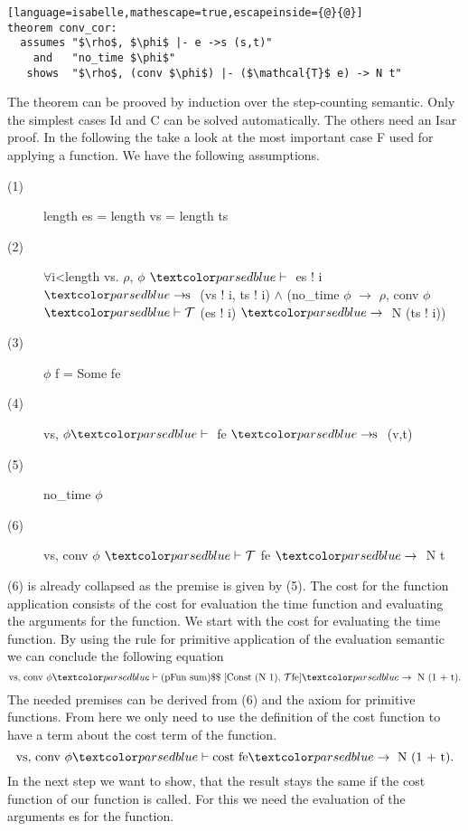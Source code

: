 \begin{lstlisting}[language=isabelle,mathescape=true,escapeinside={@}{@}]
theorem conv_cor:
  assumes "$\rho$, $\phi$ |- e ->s (s,t)"
    and   "no_time $\phi$"
   shows  "$\rho$, (conv $\phi$) |- ($\mathcal{T}$ e) -> N t"
\end{lstlisting}

The theorem can be prooved by induction over the step-counting semantic.
Only the simplest cases Id and C can be solved automatically.
The others need an Isar proof.
In the following the take a look at the most important case F used for applying a function.
We have the following assumptions.
\begin{description}
  \item[(1)] length es = length vs = length ts
  \item[(2)] $\forall$i<length vs. $\rho$, $\phi$ $\hvdash$ es ! i $\hrightarrows$ (vs ! i, ts ! i) $\land$ (no\_time $\phi$ $\longrightarrow$ $\rho$, conv $\phi$ $\hvdash \mathcal{T}$ (es ! i) $\hrightarrow$ N (ts ! i))
  \item[(3)] $\phi$ f = Some fe
  \item[(4)] vs, $\phi \hvdash$ fe $\hrightarrows$ (v,t)
  \item[(5)] no\_time $\phi$
  \item[(6)] vs, conv $\phi$ $\hvdash \mathcal{T}$ fe $\hrightarrow$ N t
\end{description}
(6) is already collapsed as the premise is given by (5).
The cost for the function application consists of the cost for evaluation the time function and evaluating the arguments for the function.
We start with the cost for evaluating the time function.
By using the rule for primitive application of the evaluation semantic we can conclude the following equation
\begin{equation*}
\text{vs, conv } \phi \hvdash \text{(pFun sum)\$\$ } [  \text{Const (N 1), } \mathcal{T} \text{fe} ] \hrightarrow \text{ N (1 + t)}.
\end{equation*}
The needed premises can be derived from (6) and the axiom for primitive functions. From here we only need to use the definition of the cost function to have a term about the cost term of the function.
\begin{equation}
\text{vs, conv } \phi \hvdash \text{cost fe} \hrightarrow \text{ N (1 + t)}.
\end{equation}
In the next step we want to show, that the result stays the same if the cost function of our function is called.
For this we need the evaluation of the arguments es for the function.
